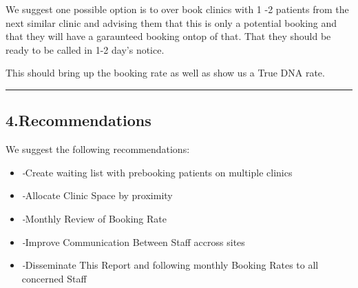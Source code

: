 \documentclass[]{article}
\providecommand{\tightlist}{%
  \setlength{\itemsep}{0pt}\setlength{\parskip}{0pt}}
\begin{document}
We suggest one possible option is to over book clinics with 1 -2
patients from the next similar clinic and advising them that this is
only a potential booking and that they will have a garaunteed booking
ontop of that. That they should be ready to be called in 1-2 day's
notice.

This should bring up the booking rate as well as show us a True DNA
rate.

\begin{center}\rule{0.5\linewidth}{0.5pt}\end{center}

\hypertarget{recommendations}{%
\subsection{4.Recommendations}\label{recommendations}}

We suggest the following recommendations:

\begin{itemize}
\tightlist
\item
  \emph{-}Create waiting list with prebooking patients on multiple
  clinics
\item
  \emph{-}Allocate Clinic Space by proximity\\
\item
  \emph{-}Monthly Review of Booking Rate\\
\item
  \emph{-}Improve Communication Between Staff accross sites\\
\item
  \emph{-}Disseminate This Report and following monthly Booking Rates to
  all concerned Staff
\end{itemize}
\end{document}
